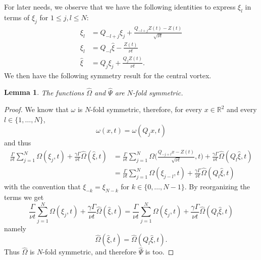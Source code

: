 \documentclass[11pt,reqno,a4paper]{amsart}
\def\R {\mathbb{R}} %
\newcommand{\1}{\mathbbm{1}}
\newtheorem{lemma}[proposition]{Lemma}
\theoremstyle{definition}
\theoremstyle{definition}
\numberwithin{equation}{section}
\begin{document}
For later needs, we observe that we have the following identities to express $\xi_l$ in terms of $\xi_j$ for $1 \le j,l \le N$:
\begin{align}\label{eq:xi_l_in_xi_j}
    \xi_l & = Q_{-l+j} \xi_j + \frac{Q_{-l+j} Z(t) - Z(t)}{\sqrt{\nu t}} \\
    \xi_l & = Q_{-l} \widehat{\xi} - \frac{Z(t)}{\nu t} \\
    \widehat{\xi} & = Q_j\xi_j + \frac{Q_j Z(t)}{\nu t}.
\end{align}
We then have the following symmetry result for the central vortex.
\begin{lemma}\label{lem:Nfold}
    The functions $\widehat{\Omega}$ and $\widehat{\Psi}$ are $N$-fold symmetric.
\end{lemma}
\begin{proof}
    We know that $\omega$ is $N$-fold symmetric, therefore, for every $x \in \R^2$ and every $l \in \{1,\ldots,N\}$,
    \begin{equation}
        \omega(x,t) = \omega(Q_j x,t)
    \end{equation}
    and thus
    \begin{align}
        \frac{\Gamma}{\nu t}\sum_{j=1}^N \Omega(\xi_j,t)+\frac{\gamma \Gamma}{\nu t} \widehat{\Omega}(\widehat{\xi},t) &  = \frac{\Gamma}{\nu t}\sum_{j=1}^N \Omega\bigg(\frac{Q_{-j+l}x-Z(t)}{\sqrt{\nu t}},t\bigg)+\frac{\gamma \Gamma}{\nu t} \widehat{\Omega}(Q_l \widehat{\xi},t) \\
        & = \frac{\Gamma}{\nu t}\sum_{j=1}^N \Omega(\xi_{j-l},t)+\frac{\gamma \Gamma}{\nu t} \widehat{\Omega}(Q_l \widehat{\xi},t)
    \end{align}
    with the convention that $\xi_{-k} = \xi_{N-k}$ for $k \in \{0,\ldots,N-1\}$. By reorganizing the terms we get
\begin{equation}
    \frac{\Gamma}{\nu t}\sum_{j=1}^N \Omega(\xi_j,t)+\frac{\gamma \Gamma}{\nu t} \widehat{\Omega}(\widehat{\xi},t) = \frac{\Gamma}{\nu t}\sum_{j=1}^N \Omega(\xi_j,t)+\frac{\gamma \Gamma}{\nu t} \widehat{\Omega}(Q_l \widehat{\xi},t)
\end{equation}
namely
\begin{equation}
    \widehat{\Omega}(\widehat{\xi},t) = \widehat{\Omega}(Q_l \widehat{\xi},t).
\end{equation}
Thus $\widehat{\Omega}$ is $N$-fold symmetric, and therefore $\widehat{\Psi}$ is too.
\end{proof}
\end{document}
